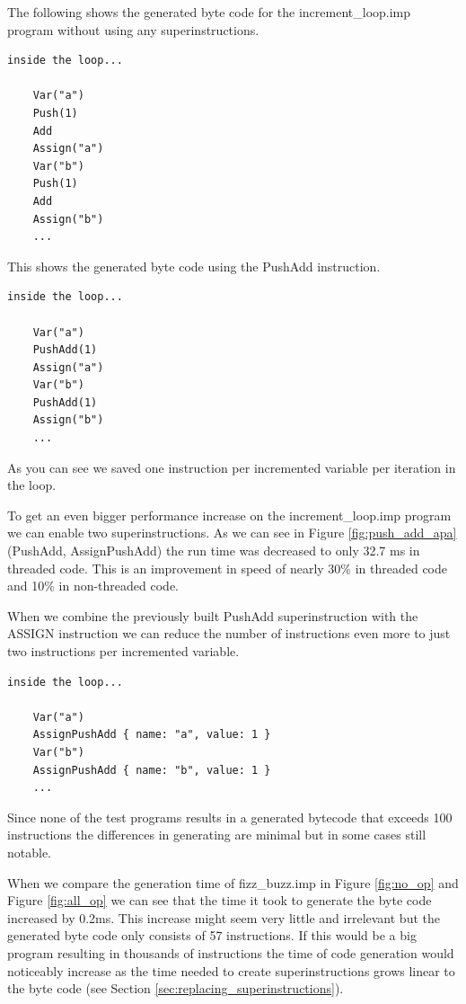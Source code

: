 \documentclass{article}
\begin{document}
The following shows the generated byte code for the increment\_loop.imp program
without using any superinstructions.
\begin{verbatim}
inside the loop...

    Var("a")
    Push(1)
    Add
    Assign("a")
    Var("b")
    Push(1)
    Add
    Assign("b")
    ...
\end{verbatim}

This shows the generated byte code using the PushAdd instruction.
\begin{verbatim}
inside the loop...

    Var("a")
    PushAdd(1)
    Assign("a")
    Var("b")
    PushAdd(1)
    Assign("b")
    ...
\end{verbatim}

As you can see we saved one instruction per incremented variable per
iteration in the loop. 

To get an even bigger performance increase on the increment\_loop.imp program
we can enable two superinstructions. As we can see in Figure
\ref{fig:push_add_apa} (PushAdd, AssignPushAdd) the run time was decreased to
only 32.7 ms in threaded code. This is an improvement in speed of nearly 30\%
in threaded code and 10\% in non-threaded code.

When we combine the previously built PushAdd superinstruction with the ASSIGN
instruction we can reduce the number of instructions even more to just two
instructions per incremented variable.

\begin{verbatim}
inside the loop...

    Var("a")
    AssignPushAdd { name: "a", value: 1 }
    Var("b")
    AssignPushAdd { name: "b", value: 1 }
    ...
\end{verbatim}

Since none of the test programs results in a generated bytecode that exceeds
100 instructions the differences in generating are minimal but in some cases
still notable.

When we compare the generation time of fizz\_buzz.imp in Figure \ref{fig:no_op}
and Figure \ref{fig:all_op} we can see that the time it took to generate the
byte code increased by 0.2ms. This increase might seem very little and
irrelevant but the generated byte code only consists of 57 instructions. If
this would be a big program resulting in thousands of instructions the time of
code generation would noticeably increase as the time needed to create
superinstructions grows linear to the byte code (see Section
\ref{sec:replacing_superinstructions}).
\end{document}
